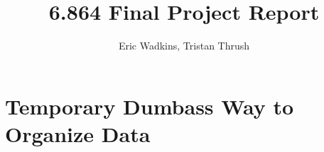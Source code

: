 \documentclass[12pt]{article}
\begin{document}
\title{\textbf{6.864 Final Project Report}}
\author{Eric Wadkins, Tristan Thrush}
\maketitle

\section{Temporary Dumbass Way to Organize Data}
	\begin{center}

\end{center}
\end{document}
